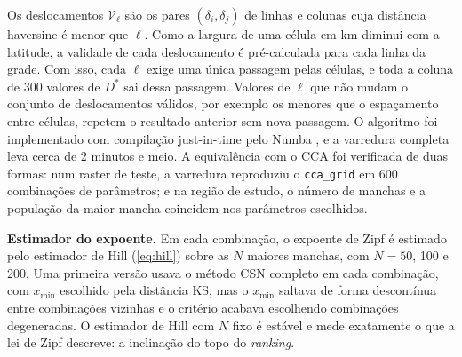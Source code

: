 \begin{algorithm}[ht!]
	\SetSpacedAlgorithm
	\caption{\label{alg:varredura}Varredura do CCA em $D^{*}$ para um $\ell$ fixo}
\end{algorithm}

Os deslocamentos $\mathcal{V}_\ell$ são os pares $(\delta_i, \delta_j)$ de linhas e colunas cuja distância haversine é menor que $\ell$. Como a largura de uma célula em km diminui com a latitude, a validade de cada deslocamento é pré-calculada para cada linha da grade. Com isso, cada $\ell$ exige uma única passagem pelas células, e toda a coluna de 300 valores de $D^{*}$ sai dessa passagem. Valores de $\ell$ que não mudam o conjunto de deslocamentos válidos, por exemplo os menores que o espaçamento entre células, repetem o resultado anterior sem nova passagem. O algoritmo foi implementado com compilação just-in-time pelo Numba \cite{lam2015}, e a varredura completa leva cerca de 2 minutos e meio. A equivalência com o CCA foi verificada de duas formas: num raster de teste, a varredura reproduziu o \texttt{cca\_grid} em 600 combinações de parâmetros; e na região de estudo, o número de manchas e a população da maior mancha coincidem nos parâmetros escolhidos.

\textbf{Estimador do expoente.} Em cada combinação, o expoente de Zipf é estimado pelo estimador de Hill (\autoref{eq:hill}) sobre as $N$ maiores manchas, com $N = 50$, 100 e 200. Uma primeira versão usava o método CSN completo em cada combinação, com $x_{\min}$ escolhido pela distância KS, mas o $x_{\min}$ saltava de forma descontínua entre combinações vizinhas e o critério acabava escolhendo combinações degeneradas. O estimador de Hill com $N$ fixo é estável e mede exatamente o que a lei de Zipf descreve: a inclinação do topo do \textit{ranking}.

